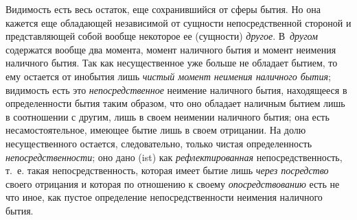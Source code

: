 Видимость есть весь остаток, еще сохранившийся от сферы бытия. Но она
кажется еще обладающей независимой от сущности непосредственной стороной и
представляющей собой вообще некоторое ее (сущности)
{\em другое}. В~{\em другом}
содержатся вообще два момента, момент наличного бытия и момент неимения
наличного бытия. Так как несущественное уже больше не обладает бытием, то
ему остается от инобытия лишь {\em чистый момент
неимения наличного бытия}; видимость есть это
{\em непосредственное} неимение наличного бытия,
находящееся в определенности бытия таким образом, что оно обладает наличным
бытием лишь в соотношении с другим, лишь в своем неимении наличного бытия;
она есть несамостоятельное, имеющее бытие лишь в своем отрицании. На долю
несущественного остается, следовательно, только чистая определенность
{\em непосредственности}; оно дано (ist) как
{\em рефлектированная} непосредственность, т.~е. такая
непосредственность, которая имеет бытие лишь {\em через
посредство} своего отрицания и которая по отношению к своему
{\em опосредствованию} есть не что иное, как пустое
определение непосредственности неимения наличного бытия.

